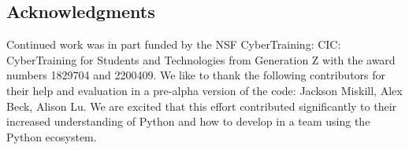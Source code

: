\hypertarget{acknowledgments}{%
\subsection{Acknowledgments}\label{acknowledgments}}

Continued work was in part funded by the NSF CyberTraining: CIC:
CyberTraining for Students and Technologies from Generation Z with the
award numbers 1829704 and 2200409. We like to thank the following
contributors for their help and evaluation in a pre-alpha version of the
code: Jackson Miskill, Alex Beck, Alison Lu. We are excited that this
effort contributed significantly to their increased understanding of
Python and how to develop in a team using the Python ecosystem.
